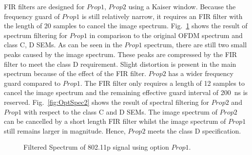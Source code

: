 FIR filters are designed for $\mathit{Prop}1$, $\mathit{Prop}2$ using a Kaiser window.
Because the frequency guard of $\mathit{Prop}1$ is still relatively narrow, it requires an FIR filter with the length of 20 samples to cancel the image spectrum.
Fig.~\ref{fig:OptSpec1} shows the result of spectrum filtering for $\mathit{Prop}1$ in comparison to the original OFDM spectrum and class C, D SEMs.
As can be seen in the $\mathit{Prop}1$ spectrum, there are still two small peaks caused by the image spectrum.
These peaks are compressed by the FIR filter to meet the class D requirement.
Slight distortion is present in the main spectrum because of the effect of the FIR filter.
$\mathit{Prop}2$ has a wider frequency guard compared to $\mathit{Prop}1$.
The FIR filter only requires a length of 12 samples to cancel the image spectrum and the remaining effective guard interval of 200~ns is reserved.
Fig.~\ref{fig:OptSpec2} shows the result of spectral filtering for $\mathit{Prop}2$ and $\mathit{Prop}1$ with respect to the class C and D SEMs.
The image spectrum of $\mathit{Prop}2$ can be cancelled by a short length FIR filter whilst the image spectrum of $\mathit{Prop}1$ still remains larger in magnitude.
Hence, $\mathit{Prop}2$ meets the class D specification.

\begin{figure}
	\centering
	\vspace{-2mm}
\caption{Filtered Spectrum of 802.11p signal using option $\mathit{Prop}1$.}
\label{fig:OptSpec1}
\end{figure}

